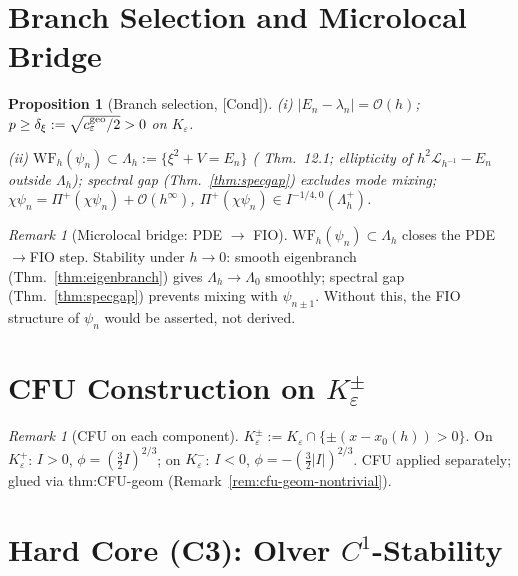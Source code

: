 \documentclass[12pt,a4paper]{amsart}
\newtheorem{proposition}[theorem]{Proposition}
\theoremstyle{definition}
\theoremstyle{remark}
\newtheorem{remark}[theorem]{Remark}
\newcommand{\Cond}{\textup{[Cond]}}
\begin{document}
\section{Branch Selection and Microlocal Bridge}
\label{sec:branch}

\begin{proposition}[Branch selection, \Cond]
\label{prop:branch-selection}
\textit{(i)} $|E_n-\lambda_n|=\mathcal{O}(h)$;
$p\ge\delta_\xi:=\sqrt{c_\varepsilon^{\rm geo}/2}>0$ on $K_\varepsilon$.

\textit{(ii)} $\mathrm{WF}_h(\psi_n)\subset\Lambda_h:=\{\xi^2+V=E_n\}$
(\cite{Zworski2012} Thm.~12.1;
ellipticity of $h^2\mathcal{L}_{h^{-1}}-E_n$ outside $\Lambda_h$);
spectral gap (Thm.~\ref{thm:specgap}) excludes mode mixing;
$\chi\psi_n=\Pi^+(\chi\psi_n)+\mathcal{O}(h^\infty)$,
$\Pi^+(\chi\psi_n)\in I^{-1/4,0}(\Lambda_h^+)$.
\end{proposition}

\begin{remark}[Microlocal bridge: PDE $\to$ FIO]
\label{rem:micro-bridge}
$\mathrm{WF}_h(\psi_n)\subset\Lambda_h$ closes the PDE$\to$FIO step.
Stability under $h\to 0$: smooth eigenbranch (Thm.~\ref{thm:eigenbranch})
gives $\Lambda_h\to\Lambda_0$ smoothly;
spectral gap (Thm.~\ref{thm:specgap}) prevents mixing with $\psi_{n\pm 1}$.
Without this, the FIO structure of $\psi_n$ would be asserted, not derived.
\end{remark}

\section{CFU Construction on $K_\varepsilon^\pm$}
\label{sec:cfu-components}

\begin{remark}[CFU on each component]
\label{rem:cfu-components}
$K_\varepsilon^\pm:=K_\varepsilon\cap\{\pm(x-x_0(h))>0\}$.
On $K_\varepsilon^+$: $I>0$, $\phi=(\tfrac32 I)^{2/3}$;
on $K_\varepsilon^-$: $I<0$, $\phi=-(\tfrac32|I|)^{2/3}$.
CFU \cite{CFU1957} applied separately;
glued via thm:CFU-geom (Remark~\ref{rem:cfu-geom-nontrivial}).
\end{remark}

\section{Hard Core (C3): Olver $C^1$-Stability}
\label{sec:olver-C1}
\end{document}
